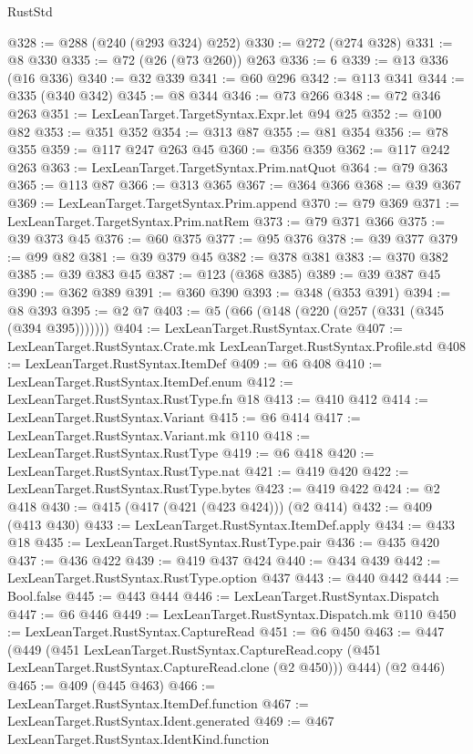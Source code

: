 \begin{lexlean}{RustStd}
\begin{coremodule}
@328 := @288 (@240 (@293 @324) @252)
@330 := @272 (@274 @328)
@331 := @8 @330
@335 := @72 (@26 (@73 @260)) @263
@336 := 6
@339 := @13 @336 (@16 @336)
@340 := @32 @339
@341 := @60 @296
@342 := @113 @341
@344 := @335 (@340 @342)
@345 := @8 @344
@346 := @73 @266
@348 := @72 @346 @263
@351 := LexLeanTarget.TargetSyntax.Expr.let @94 @25
@352 := @100 @82
@353 := @351 @352
@354 := @313 @87
@355 := @81 @354
@356 := @78 @355
@359 := @117 @247 @263 @45
@360 := @356 @359
@362 := @117 @242 @263
@363 := LexLeanTarget.TargetSyntax.Prim.natQuot
@364 := @79 @363
@365 := @113 @87
@366 := @313 @365
@367 := @364 @366
@368 := @39 @367
@369 := LexLeanTarget.TargetSyntax.Prim.append
@370 := @79 @369
@371 := LexLeanTarget.TargetSyntax.Prim.natRem
@373 := @79 @371 @366
@375 := @39 @373 @45
@376 := @60 @375
@377 := @95 @376
@378 := @39 @377
@379 := @99 @82
@381 := @39 @379 @45
@382 := @378 @381
@383 := @370 @382
@385 := @39 @383 @45
@387 := @123 (@368 @385)
@389 := @39 @387 @45
@390 := @362 @389
@391 := @360 @390
@393 := @348 (@353 @391)
@394 := @8 @393
@395 := @2 @7
@403 := @5 (@66 (@148 (@220 (@257 (@331 (@345 (@394 @395)))))))
@404 := LexLeanTarget.RustSyntax.Crate
@407 := LexLeanTarget.RustSyntax.Crate.mk LexLeanTarget.RustSyntax.Profile.std
@408 := LexLeanTarget.RustSyntax.ItemDef
@409 := @6 @408
@410 := LexLeanTarget.RustSyntax.ItemDef.enum
@412 := LexLeanTarget.RustSyntax.RustType.fn @18
@413 := @410 @412
@414 := LexLeanTarget.RustSyntax.Variant
@415 := @6 @414
@417 := LexLeanTarget.RustSyntax.Variant.mk @110
@418 := LexLeanTarget.RustSyntax.RustType
@419 := @6 @418
@420 := LexLeanTarget.RustSyntax.RustType.nat
@421 := @419 @420
@422 := LexLeanTarget.RustSyntax.RustType.bytes
@423 := @419 @422
@424 := @2 @418
@430 := @415 (@417 (@421 (@423 @424))) (@2 @414)
@432 := @409 (@413 @430)
@433 := LexLeanTarget.RustSyntax.ItemDef.apply
@434 := @433 @18
@435 := LexLeanTarget.RustSyntax.RustType.pair
@436 := @435 @420
@437 := @436 @422
@439 := @419 @437 @424
@440 := @434 @439
@442 := LexLeanTarget.RustSyntax.RustType.option @437
@443 := @440 @442
@444 := Bool.false
@445 := @443 @444
@446 := LexLeanTarget.RustSyntax.Dispatch
@447 := @6 @446
@449 := LexLeanTarget.RustSyntax.Dispatch.mk @110
@450 := LexLeanTarget.RustSyntax.CaptureRead
@451 := @6 @450
@463 := @447
    (@449
      (@451
        LexLeanTarget.RustSyntax.CaptureRead.copy
        (@451 LexLeanTarget.RustSyntax.CaptureRead.clone (@2 @450)))
      @444)
    (@2 @446)
@465 := @409 (@445 @463)
@466 := LexLeanTarget.RustSyntax.ItemDef.function
@467 := LexLeanTarget.RustSyntax.Ident.generated
@469 := @467 LexLeanTarget.RustSyntax.IdentKind.function

\end{coremodule}
\end{lexlean}

